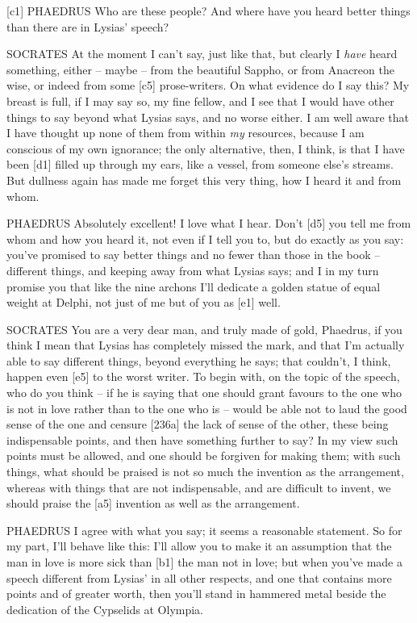 {[}c1{]} PHAEDRUS Who are these people? And where have you heard better
things than there are in Lysias' speech?

SOCRATES At the moment I can't say, just like that, but clearly I
{\em have} heard
something, either --
maybe -- from the beautiful Sappho, or from Anacreon the wise, or indeed
from some {[}c5{]}
prose-writers. On what
evidence do I say this? My breast is full, if I may say so, my fine
fellow, and I see that I would have other things to say beyond what
Lysias says, and no worse either. I am well aware that I have thought up
none of them from within {\em my} resources, because I am conscious of
my own ignorance; the only alternative, then, I think, is that I have
been {[}d1{]} filled up through my ears, like a vessel, from someone
else's streams. But dullness again has made me forget this very thing,
how I heard it and from whom.

PHAEDRUS Absolutely
excellent! I love what I
hear. Don't {[}d5{]} you tell me from whom and how you heard it, not
even if I tell you to, but do exactly as you say: you've promised to say
better things and no fewer than those in the book -- different things,
and keeping away from what Lysias says; and I in my turn promise you
that like the nine
archons I'll dedicate a
golden statue of equal weight at Delphi, not just of me but of you as
{[}e1{]} well.

SOCRATES You are a very dear man, and truly made of gold, Phaedrus, if
you think I mean that Lysias has completely missed the mark, and that
I'm actually able to say different things, beyond everything he says;
that couldn't, I think, happen even {[}e5{]} to the worst writer. To
begin with, on the topic of the speech, who do you think -- if he is
saying that one should grant favours to the one who is not in love
rather than to the one who is -- would be able not to laud the good
sense of the one and censure {[}236a{]} the lack of sense of the other,
these being indispensable points, and then have something further to
say? In my view such points must be allowed, and one should be forgiven
for making them; with such things, what should be praised is not so much
the invention as the arrangement, whereas with things that are not
indispensable, and are difficult to invent, we should praise the
{[}a5{]} invention as well as the arrangement.

PHAEDRUS I agree with what you say; it seems a reasonable statement. So
for my part, I'll behave like this: I'll allow you to make it an
assumption that the man in love is more sick than {[}b1{]} the man not
in love; but when you've made a speech different from Lysias' in all
other respects, and one that contains more points and of greater worth,
then you'll stand in hammered metal beside the dedication of the
Cypselids at Olympia.

